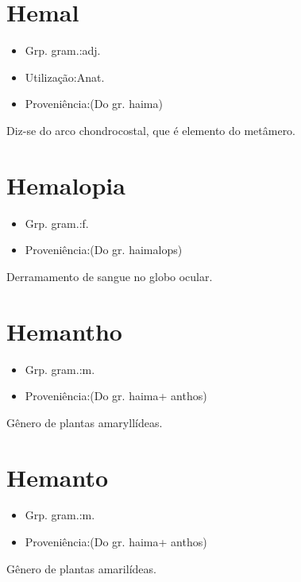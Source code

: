 \documentclass{article}
\begin{document}
\section{Hemal}
\begin{itemize}
\item {Grp. gram.:adj.}
\end{itemize}
\begin{itemize}
\item {Utilização:Anat.}
\end{itemize}
\begin{itemize}
\item {Proveniência:(Do gr. \textunderscore haima\textunderscore )}
\end{itemize}
Diz-se do arco chondrocostal, que é elemento do metâmero.
\section{Hemalopia}
\begin{itemize}
\item {Grp. gram.:f.}
\end{itemize}
\begin{itemize}
\item {Proveniência:(Do gr. \textunderscore haimalops\textunderscore )}
\end{itemize}
Derramamento de sangue no globo ocular.
\section{Hemantho}
\begin{itemize}
\item {Grp. gram.:m.}
\end{itemize}
\begin{itemize}
\item {Proveniência:(Do gr. \textunderscore haima\textunderscore  + \textunderscore anthos\textunderscore )}
\end{itemize}
Gênero de plantas amaryllídeas.
\section{Hemanto}
\begin{itemize}
\item {Grp. gram.:m.}
\end{itemize}
\begin{itemize}
\item {Proveniência:(Do gr. \textunderscore haima\textunderscore  + \textunderscore anthos\textunderscore )}
\end{itemize}
Gênero de plantas amarilídeas.
\end{document}
